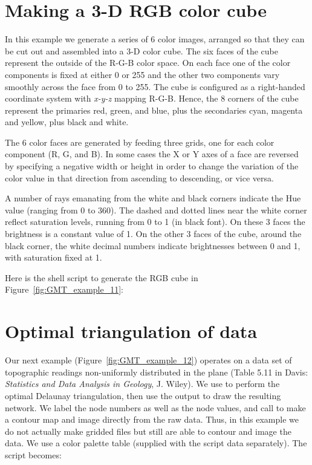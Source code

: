 

\section{Making a 3-D RGB color cube}

In this example we generate a series of 6 color images,
arranged so that they can be cut out
and assembled into a 3-D color cube.  The six faces of
the cube represent the outside of the R-G-B color space.
On each face one of the color components is fixed at either
0 or 255 and the other two components vary smoothly across
the face from 0 to 255.  The cube is configured as a
right-handed coordinate system with \emph{x-y-z} mapping
R-G-B.  Hence, the 8 corners of the cube represent the
primaries red, green, and blue, plus the secondaries cyan,
magenta and yellow, plus black and white.

The 6 color faces are generated by feeding  three grids, one for each color
component (R, G, and B). In some cases the X or Y axes of a face are reversed by specifying a
negative width or height in order to change the variation of the color value in that direction from
ascending to descending, or vice versa.

A number of rays emanating from the white and black corners indicate the Hue value (ranging from 0 to
360\DS). The dashed and dotted lines near the white corner reflect saturation levels, running from 0
to 1 (in black font). On these 3 faces the brightness is a constant value of 1.
On the other 3 faces of the cube, around the black corner, the white decimal numbers indicate
brightnesses between 0 and 1, with saturation fixed at 1.

Here is the shell script to generate the RGB cube in Figure~\ref{fig:GMT_example_11}:



\section{Optimal triangulation of data}

Our next example (Figure~\ref{fig:GMT_example_12})
operates on a data set of topographic
readings non-uniformly distributed in the plane (Table
5.11 in Davis: {\it Statistics and Data Analysis in Geology},
J. Wiley).  We use  to perform the optimal
Delaunay triangulation, then use the output to draw the
resulting network.  We label the node numbers as well as
the node values, and call  to make a contour
map and image directly from the raw data.  Thus, in this
example we do not actually make gridded files but still
are able to contour and image the data.  We use a color
palette table  (supplied with the script data
separately).  The script becomes:

